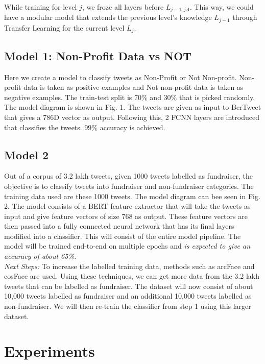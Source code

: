 \documentclass[11pt,a4paper]{article}
\begin{document}
While training for level $j$, we froze all layers before $L_{j-1,j A}$. This way, we could have a modular model that extends the previous level's knowledge $L_{j-1}$ through Transfer Learning for the current level $L_j$.

\subsection{Model 1: Non-Profit Data vs NOT}
Here we create a model to classify tweets as Non-Profit or Not Non-profit. Non-profit data is taken as positive examples and Not non-profit data is taken as negative examples. The train-test split is 70\% and 30\% that is picked randomly. The model diagram is shown in Fig. 1. The tweets are given as input to BerTweet that gives a 786D vector as output. Following this, 2 FCNN layers are introduced that classifies the tweets. 99\% accuracy is achieved.

\subsection{Model 2}
Out of a corpus of 3.2 lakh tweets, given 1000 tweets labelled as fundraiser, the objective is to classify tweets into fundraiser and non-fundraiser categories. The training data used are these 1000 tweets. The model diagram can bee seen in Fig. 2. The model consists of a BERT feature extractor that will take the tweets as input and give feature vectors of size 768 as output. These feature vectors are then passed into a fully connected neural network that has its final layers modified into a classifier. This will consist of the entire model pipeline. The model will be trained end-to-end on multiple epochs and \emph{is expected to give an accuracy of about 65\%.}\\

\emph{Next Steps:}
To increase the labelled training data, methods such as arcFace and cosFace are used. Using these techniques, we can get more data from the 3.2 lakh tweets that can be labelled as fundraiser. The dataset will now consist of about 10,000 tweets labelled as fundraiser and an additional 10,000 tweets labelled as non-fundraiser. We will then re-train the classifier from step 1 using this larger dataset.



\section{Experiments}
\end{document}
